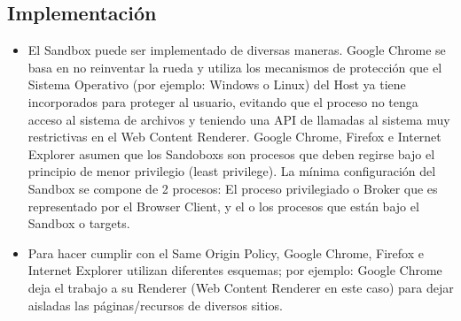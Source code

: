 \subsection{Implementación}
\begin{itemize}
\item El Sandbox puede ser implementado de diversas maneras. Google Chrome \cite{sandboxGC} se basa en no reinventar la rueda y utiliza los mecanismos de protección que el Sistema Operativo (por ejemplo: Windows o Linux) del Host ya tiene incorporados para proteger al usuario, evitando que el proceso no tenga acceso al sistema de archivos y teniendo una API de llamadas al sistema muy restrictivas en el Web Content Renderer. Google Chrome, Firefox e Internet Explorer asumen que los Sandoboxs son procesos que deben regirse bajo el principio de menor privilegio (least privilege). La mínima configuración del Sandbox se compone de 2 procesos: El proceso privilegiado o Broker que es representado por el Browser Client, y el o los procesos que están bajo el Sandbox o targets.
\item Para hacer cumplir con el Same Origin Policy, Google Chrome, Firefox e Internet Explorer utilizan diferentes esquemas; por ejemplo: Google Chrome deja el trabajo a su Renderer (Web Content Renderer en este caso) para dejar aisladas las páginas/recursos de diversos sitios.
\end{itemize}

